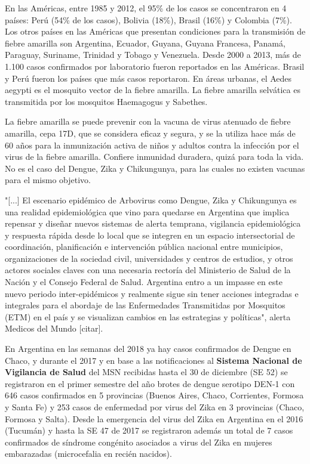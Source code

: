 En las Américas, entre 1985 y 2012, el 95\% de los casos se concentraron en
4 países: Perú (54\% de los casos), Bolivia (18\%), Brasil (16\%) y Colombia (7\%).
Los otros países en las Américas que presentan condiciones para la transmisión
de fiebre amarilla son Argentina, Ecuador, Guyana, Guyana Francesa, Panamá,
Paraguay, Suriname, Trinidad y Tobago y Venezuela.
Desde 2000 a 2013, más de 1.100 casos confirmados por laboratorio fueron
reportados en las Américas. Brasil y Perú fueron los países que más casos
reportaron. En áreas urbanas, el Aedes aegypti es el mosquito vector de la
fiebre amarilla. La fiebre amarilla selvática es transmitida por los mosquitos
Haemagogus y Sabethes.

La fiebre amarilla se puede prevenir con la vacuna de virus atenuado de fiebre
amarilla, cepa 17D, que se considera eficaz y segura, y se la utiliza hace más
de 60 años para la inmunización activa de niños y adultos contra la infección
por el virus de la fiebre amarilla. Confiere inmunidad duradera, quizá para toda
la vida. No es el caso del Dengue, Zika y Chikungunya, para las cuales no existen
vacunas para el mismo objetivo.


"[...] El escenario epidémico de Arbovirus como Dengue, Zika y Chikungunya es una
realidad epidemiológica que vino para quedarse en Argentina que implica repensar
y diseñar nuevos sistemas de alerta temprana, vigilancia epidemiológica y
respuesta rápida desde lo local que se integren en un espacio intersectorial de
coordinación, planificación e intervención pública nacional entre municipios,
organizaciones de la sociedad civil, universidades y centros de estudios, y
otros actores sociales claves con una necesaria rectoría del
Ministerio de Salud de la Nación y el Consejo Federal de Salud.
Argentina entro a un impasse en este nuevo periodo inter-epidémicos y realmente
sigue sin tener acciones integradas e integrales para el abordaje de las
Enfermedades Transmitidas por Mosquitos (ETM) en el país y se visualizan
cambios en las estrategias y políticas", alerta Medicos del Mundo [citar].



En Argentina en las semanas del 2018 ya hay casos confirmados de Dengue en Chaco,
y durante el 2017 y en base a las notificaciones al
\textbf{Sistema Nacional de Vigilancia de Salud} del MSN recibidas hasta el
30 de diciembre (SE 52) se registraron en el primer semestre del año brotes de
dengue serotipo DEN-1 con 646 casos confirmados en 5 provincias
(Buenos Aires, Chaco, Corrientes, Formosa y Santa Fe) y 253 casos de enfermedad
por virus del Zika en 3 provincias (Chaco, Formosa y Salta).
Desde la emergencia del virus del Zika en Argentina en el 2016 (Tucumán) y hasta
la SE 47 de 2017 se registraron además un total de 7 casos confirmados de
síndrome congénito asociados a virus del Zika en mujeres embarazadas (microcefalia en recién nacidos).



